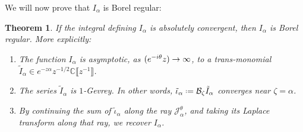 \documentclass{article}
\let\Re\relax
\DeclareMathOperator{\Re}{Re}
\newcommand{\C}{\mathbb{C}}
\newcommand*{\defeq}{\mathrel{\vcenter{\baselineskip0.5ex \lineskiplimit0pt
                     \hbox{\scriptsize.}\hbox{\scriptsize.}}}%
                     =}
\newcommand{\borel}{\mathcal{B}}
\theoremstyle{definition}
\theoremstyle{plain}
\newtheorem{theorem}{Theorem}[section]
\begin{document}
We will now prove that $I_\alpha$ is Borel regular:
\begin{theorem}\label{thm:maxim-proof}
If the integral defining $I_\alpha$ is absolutely convergent, then $I_\alpha$ is Borel regular. More explicitly: 
\begin{enumerate}
\item\label{part-1-prf} The function $I_\alpha$ is asymptotic, as $\Re (e^{-i\theta} z) \to \infty$, to a trans-monomial $\tilde{I}_\alpha\in e^{-z \alpha} z^{-1/2} \C\llbracket z^{-1}\rrbracket$.
\item\label{part-2-prf} The series $\tilde{I}_\alpha$ is $1$-Gevrey. In other words, $\tilde{\iota}_\alpha \defeq \borel_\zeta \tilde{I}_\alpha$ converges near $\zeta=\alpha$.
\item\label{part-3-prf} By continuing the sum of $\tilde{\iota}_\alpha$ along the ray $\mathcal{J}_\alpha^\theta$, and taking its Laplace transform along that ray, we recover $I_\alpha$.
\end{enumerate}
\end{theorem}
\end{document}
